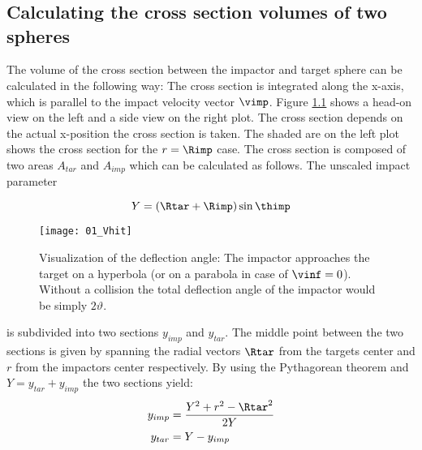 \newpage
\graphicspath{{./07figs/}}

\chapter{}
\vspace{-1.0cm}

\section{Calculating the cross section volumes of two spheres}
\label{ch07_sec01}
The volume of the cross section between the impactor and target sphere can be calculated in the following way: The cross section is integrated along the x-axis, which is parallel to the impact velocity vector $\vimp$. Figure \ref{ch07_fig01} shows a head-on view on the left and a side view on the right plot. The cross section depends on the actual x-position the cross section is taken. The shaded are on the left plot shows the cross section for the $r = \Rimp$ case. The cross section is composed of two areas $A_{tar}$ and $A_{imp}$ which can be calculated as follows. The unscaled impact parameter 

\begin{equation}
\label{ch07_sec01_eq001}
Y = ( \Rtar + \Rimp ) \sin{ \thimp } 
\end{equation}

\begin{figure}[htbp]
\begin{center}
\texttt{[image: 01\_Vhit]}
\caption{Visualization of the deflection angle: The impactor approaches the target on a hyperbola (or on a parabola in case of $\vinf = 0$). Without a collision the total deflection angle of the impactor would be simply $2 \vartheta$.}
\label{ch07_fig01}
\end{center}
\end{figure}

is subdivided into two sections $y_{imp}$ and $y_{tar}$. The middle point between the two sections is given by spanning the radial vectors $\Rtar$ from the targets center and $r$ from the impactors center respectively.    By using the Pythagorean theorem and $Y = y_{tar} + y_{imp}$ the two sections yield:
\begin{align}
\label{ch07_sec01_eq002}
y_{imp} &= \frac{Y^2 + r^2 - \Rtar^2}{2 Y} \\
y_{tar} &= Y - y_{imp}
\end{align}

